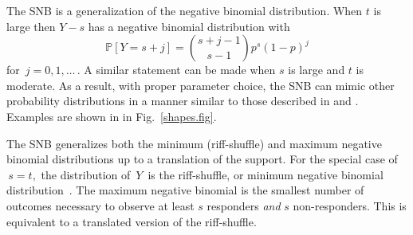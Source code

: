 \documentclass[12pt]{article}
\begin{document}
The SNB is a generalization of the negative 
binomial distribution. When $t$ is large then $Y-s$ has a 
negative binomial distribution with
\begin{equation*}                                    %
\mathbb{P}[Y=s+j ]        \label{nb1.eq}          
  = {{s+j-1}\choose{s-1}} p^s (1-p)^j
\end{equation*}
for $\,j=0, 1,\ldots\,$. A similar statement can be made when $s$ is large
and $t$ is moderate. As a result, with proper parameter choice, the SNB
can mimic other probability distributions in a manner similar to 
those described in \cite{Peizer1968} and \cite{Best1974}. Examples are
shown in in Fig.~\ref{shapes.fig}. 

The SNB generalizes both the minimum (riff-shuffle) and maximum negative
binomial distributions up to a translation of the support.
For the special case of $\,s=t,$ the distribution of $\,Y\,$ is the
riff-shuffle, or minimum negative binomial 
distribution~\citep{Uppuluri1967,Johnson2005}.
The maximum negative binomial \cite{Johnson2005,Zhang2000,Zelterman2005} is 
the smallest number of outcomes necessary to 
observe at least $s$ responders {\em and} $s$ non-responders. This is equivalent
to a translated version of the riff-shuffle. 

\end{document}
